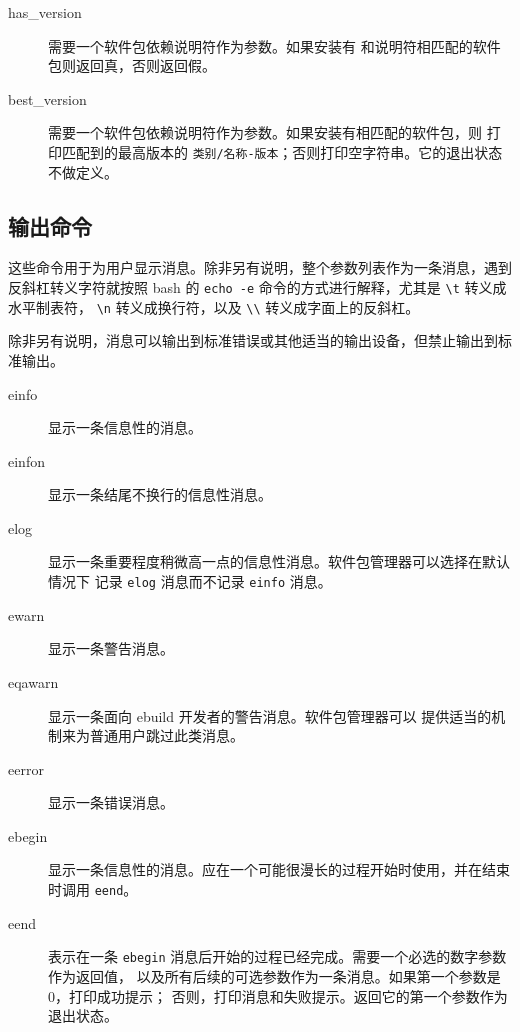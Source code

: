 \begin{description}
\item[has_version] 需要一个软件包依赖说明符作为参数。如果安装有
    和说明符相匹配的软件包则返回真，否则返回假。
\item[best_version] 需要一个软件包依赖说明符作为参数。如果安装有相匹配的软件包，则
    打印匹配到的最高版本的 \texttt{类别/名称-版本}；否则打印空字符串。它的退出状态不做定义。
\end{description}

\subsection{输出命令}
这些命令用于为用户显示消息。除非另有说明，整个参数列表作为一条消息，遇到反斜杠转义字符就按照
bash 的 \texttt{echo -e} 命令的方式进行解释，尤其是 \texttt{\textbackslash t} 转义成水平制表符，
\texttt{\textbackslash n} 转义成换行符，以及 \texttt{\textbackslash\textbackslash} 转义成字面上的反斜杠。

除非另有说明，消息可以输出到标准错误或其他适当的输出设备，但禁止输出到标准输出。

\begin{description}
\item[einfo] 显示一条信息性的消息。
\item[einfon] 显示一条结尾不换行的信息性消息。
\item[elog] 显示一条重要程度稍微高一点的信息性消息。软件包管理器可以选择在默认情况下
    记录 \texttt{elog} 消息而不记录 \texttt{einfo} 消息。
\item[ewarn] 显示一条警告消息。
\item[eqawarn] 显示一条面向 ebuild 开发者的警告消息。软件包管理器可以
    提供适当的机制来为普通用户跳过此类消息。
\item[eerror] 显示一条错误消息。
\item[ebegin] 显示一条信息性的消息。应在一个可能很漫长的过程开始时使用，并在结束时调用 \texttt{eend}。
\item[eend] 表示在一条 \texttt{ebegin} 消息后开始的过程已经完成。需要一个必选的数字参数作为返回值，
    以及所有后续的可选参数作为一条消息。如果第一个参数是 0，打印成功提示；
    否则，打印消息和失败提示。返回它的第一个参数作为退出状态。
\end{description}


